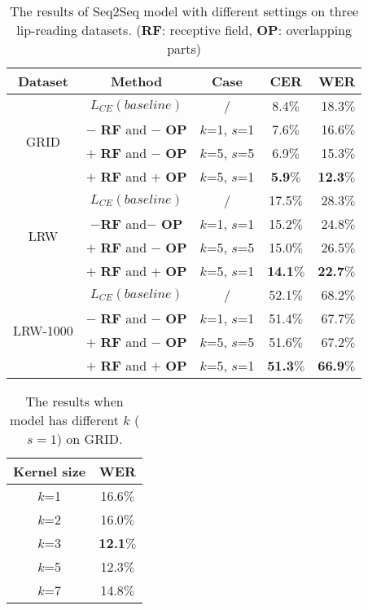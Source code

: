 \documentclass[a4paper, 10pt, conference]{ieeeconf}      %
\begin{document}
	\begin{table}[H]
		\caption{The results of Seq2Seq model with different settings on three lip-reading datasets. (\textbf{RF}: receptive field, \textbf{OP}: overlapping parts)}
		\label{table1}
		\begin{center}
			\begin{tabular}{|c||c|c||c|r|}    
				\hline
				Dataset & Method& Case& CER &  WER \\
				\hline
				\hline
				\multirow{4}{*}{GRID}&    $L_{CE} (baseline)$ & / &8.4$\%$ & 18.3$\%$ \\
				~&    $-$ \textbf{RF} and $-$ \textbf{OP}&$k$=1, $s$=1& 7.6$\%$ & 16.6$\%$\\
				~&    $+$ \textbf{RF} and $-$ \textbf{OP}&$k$=5, $s$=5& 6.9$\%$ & 15.3$\%$ \\
				~    &$+$ \textbf{RF} and $+$ \textbf{OP} &$k$=5, $s$=1& \textbf{5.9}$\%$ & \textbf{12.3}$\%$ \\
				\hline
				\multirow{4}{*}{LRW}&$L_{CE} (baseline)$ & /&17.5$\%$ & 28.3$\%$  \\
				~& $-$\textbf{RF} and$-$ \textbf{OP}&$k$=1, $s$=1& 15.2$\%$ & 24.8$\%$ \\
				~&$+$ \textbf{RF} and $-$ \textbf{OP}&$k$=5, $s$=5& 15.0$\%$ & 26.5$\%$ \\
				~&$+$ \textbf{RF} and $+$ \textbf{OP} &$k$=5, $s$=1& \textbf{14.1}$\%$ & \textbf{22.7}$\%$ \\
				\hline
				\multirow{4}{*}{LRW-1000}&$L_{CE} (baseline)$             &/  & 52.1$\%$ & 68.2$\%$     \\
				~&$-$ \textbf{RF} and $-$ \textbf{OP} &$k$=1, $s$=1& 51.4$\%$ & 67.7$\%$    \\
				~&$+$ \textbf{RF} and $-$ \textbf{OP} & $k$=5, $s$=5& 51.6$\%$   &   67.2$\%$      \\
				~&$+$ \textbf{RF} and $+$ \textbf{OP} &$k$=5, $s$=1& \textbf{51.3}$\%$ & \textbf{66.9}$\%$      \\
				\hline
			\end{tabular}
		\end{center}
	\end{table}
	\vspace{-0.6cm}
	\begin{table}[H] 
		\caption{The results when model has different $k$ ($s=1$) on GRID.} \label{table2}	
		\centering
		\begin{tabular}{|c||c|}    
			\hline
			Kernel size\centering      &     WER   \\
			\hline
			\hline
			$k$=1& 16.6$\%$\\
			$k$=2 &16.0$\%$ \\
			$k$=3&\textbf{12.1}$\%$ \\
			$k$=5 & 12.3$\%$ \\  
			$k$=7&14.8$\%$ \\
			\hline
		\end{tabular}	
	\end{table}
	\vspace{-0.4cm}
	
\end{document}
